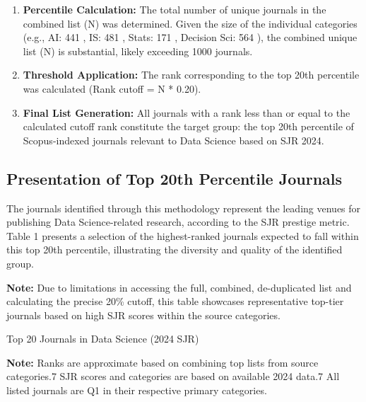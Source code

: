 \documentclass[../main.tex]{subfiles}
\begin{document}
\begin{enumerate}
    \item \textbf{Percentile Calculation:} The total number of unique journals in the combined list (N) was determined. Given the size of the individual categories (e.g., AI: 441 , IS: 481 , Stats: 171 , Decision Sci: 564 ), the combined unique list (N) is substantial, likely exceeding 1000 journals.
    
    \item \textbf{Threshold Application:} The rank corresponding to the top 20th percentile was calculated (Rank cutoff = N * 0.20).
    
    \item \textbf{Final List Generation:} All journals with a rank less than or equal to the calculated cutoff rank constitute the target group: the top 20th percentile of Scopus-indexed journals relevant to Data Science based on SJR 2024.
\end{enumerate}

\subsection{Presentation of Top 20th Percentile Journals}

\vspace{0.4cm}
\noindent
The journals identified through this methodology represent the leading venues for publishing Data Science-related research, according to the SJR prestige metric. Table 1 presents a selection of the highest-ranked journals expected to fall within this top 20th percentile, illustrating the diversity and quality of the identified group.

\vspace{0.1cm}
\footnotesize{\textbf{Note:} Due to limitations in accessing the full, combined, de-duplicated list and calculating the precise 20\% cutoff, this table showcases representative top-tier journals based on high SJR scores within the source categories}.

\begin{table}[H]
    \centering
    \scriptsize
    \caption{Top 20 Journals in Data Science (2024 SJR)}
    \label{tab:top_20_journals}
\end{table}
\vspace{0.2cm}
\footnotesize {\textbf{Note:} Ranks are approximate based on combining top lists from source categories.7 SJR scores and categories are based on available 2024 data.7 All listed journals are Q1 in their respective primary categories.}
\end{document}
